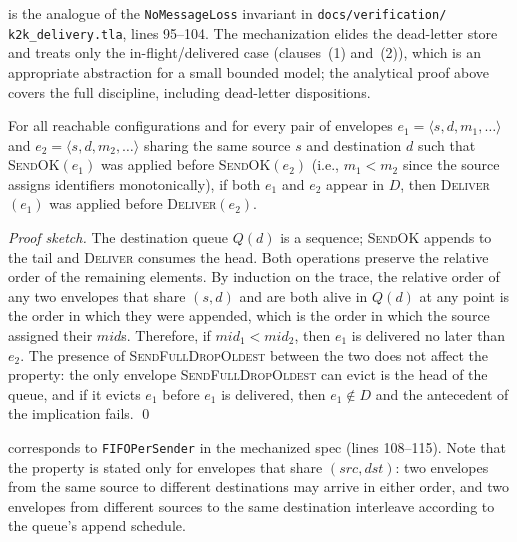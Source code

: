  is the analogue of the
\texttt{NoMessageLoss} invariant in
\texttt{docs/\allowbreak verification/\allowbreak
k2k\_delivery.tla}, lines 95--104.  The
mechanization elides the dead-letter store and treats only the
in-flight/delivered case (clauses~(1) and~(2)), which is an
appropriate abstraction for a small bounded model; the analytical
proof above covers the full discipline, including dead-letter
dispositions.

\begin{theorem}
\label{thm:fifo-per-sender}
For all reachable configurations and for every pair of envelopes
\(e_1 = \langle s, d, m_1, \ldots\rangle\) and
\(e_2 = \langle s, d, m_2, \ldots\rangle\) sharing the same source
\(s\) and destination \(d\) such that \textsc{SendOK}\((e_1)\) was
applied before \textsc{SendOK}\((e_2)\) (i.e., \(m_1 < m_2\) since
the source assigns identifiers monotonically), if both \(e_1\) and
\(e_2\) appear in \(D\), then \textsc{Deliver}\((e_1)\) was applied
before \textsc{Deliver}\((e_2)\).
\end{theorem}

\begin{proof}[Proof sketch]
The destination queue \(Q(d)\) is a sequence; \textsc{SendOK}
appends to the tail and \textsc{Deliver} consumes the head.  Both
operations preserve the relative order of the remaining elements.
By induction on the trace, the relative order of any two envelopes
that share \((s, d)\) and are both alive in \(Q(d)\) at any point
is the order in which they were appended, which is the order in
which the source assigned their \(\mathit{mid}\)s.  Therefore, if
\(\mathit{mid}_1 < \mathit{mid}_2\), then \(e_1\) is delivered no
later than \(e_2\).  The presence of \textsc{SendFullDropOldest}
between the two does not affect the property: the only envelope
\textsc{SendFullDropOldest} can evict is the head of the queue, and
if it evicts \(e_1\) before \(e_1\) is delivered, then \(e_1
\notin D\) and the antecedent of the implication fails.
\qed
\end{proof}

 corresponds to \texttt{FIFOPerSender} in
the mechanized spec (lines 108--115).  Note that the property is
stated only for envelopes that share \((\mathit{src}, \mathit{dst})\):
two envelopes from the same source to different destinations may
arrive in either order, and two envelopes from different sources to
the same destination interleave according to the queue's append
schedule.


